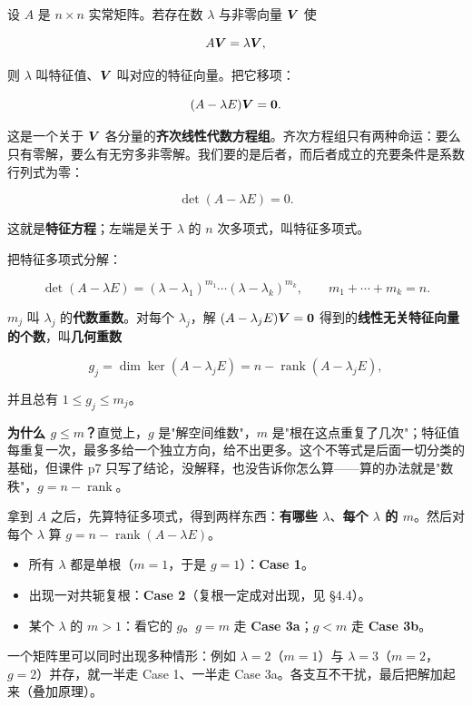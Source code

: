 \documentclass[11pt]{ctexart}
\newcommand{\rank}{\operatorname{rank}}
\begin{document}

设 $A$ 是 $n\times n$ 实常矩阵。若存在数 $\lambda$ 与非零向量 $\boldsymbol{V}$ 使

\[
A\boldsymbol{V}=\lambda\boldsymbol{V},
\]

则 $\lambda$ 叫特征值、$\boldsymbol{V}$ 叫对应的特征向量。把它移项：

\[
(A-\lambda E)\boldsymbol{V}=\boldsymbol{0}.
\]

这是一个关于 $\boldsymbol{V}$ 各分量的\textbf{齐次线性代数方程组}。齐次方程组只有两种命运：要么只有零解，要么有无穷多非零解。我们要的是后者，而后者成立的充要条件是系数行列式为零：

\[
\det(A-\lambda E)=0 .
\]

这就是\textbf{特征方程}；左端是关于 $\lambda$ 的 $n$ 次多项式，叫特征多项式。


把特征多项式分解：

\[
\det(A-\lambda E)=(\lambda-\lambda_1)^{m_1}\cdots(\lambda-\lambda_k)^{m_k},
\qquad m_1+\cdots+m_k=n .
\]

$m_j$ 叫 $\lambda_j$ 的\textbf{代数重数}。对每个 $\lambda_j$，解 $(A-\lambda_jE)\boldsymbol{V}=\boldsymbol{0}$ 得到的\textbf{线性无关特征向量的个数}，叫\textbf{几何重数}

\[
g_j=\dim\ker(A-\lambda_jE)=n-\rank(A-\lambda_jE),
\]

并且总有 $1\le g_j\le m_j$。

\textbf{为什么 $g\le m$？}直觉上，$g$ 是"解空间维数"，$m$ 是"根在这点重复了几次"；特征值每重复一次，最多多给一个独立方向，给不出更多。这个不等式是后面一切分类的基础，但课件 p7 只写了结论，没解释，也没告诉你怎么算——算的办法就是"数秩"，$g=n-\rank$。


拿到 $A$ 之后，先算特征多项式，得到两样东西：\textbf{有哪些 $\lambda$}、\textbf{每个 $\lambda$ 的 $m$}。然后对每个 $\lambda$ 算 $g=n-\rank(A-\lambda E)$。

\begin{itemize}
  \item 所有 $\lambda$ 都是单根（$m=1$，于是 $g=1$）：\textbf{Case 1}。
  \item 出现一对共轭复根：\textbf{Case 2}（复根一定成对出现，见 §4.4）。
  \item 某个 $\lambda$ 的 $m>1$：看它的 $g$。$g=m$ 走 \textbf{Case 3a}；$g<m$ 走 \textbf{Case 3b}。
\end{itemize}

一个矩阵里可以同时出现多种情形：例如 $\lambda=2$（$m=1$）与 $\lambda=3$（$m=2$，$g=2$）并存，就一半走 Case 1、一半走 Case 3a。各支互不干扰，最后把解加起来（叠加原理）。
\end{document}
